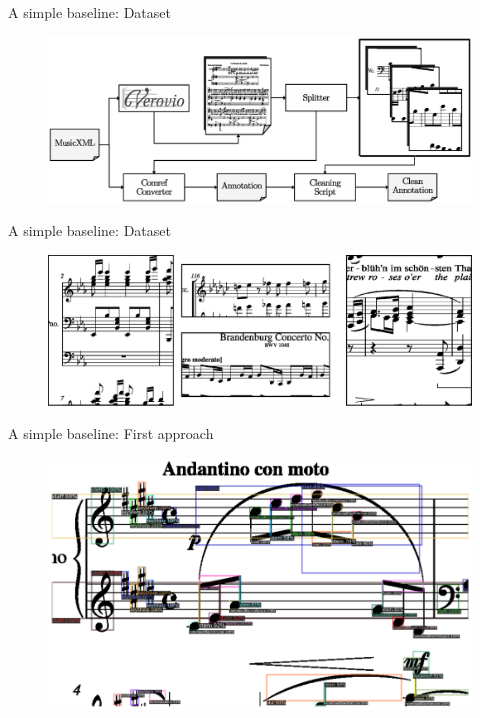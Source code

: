 \documentclass[UKenglish, aspectratio = 169]{beamer}
\begin{document}


\begin{frame}[c]{A simple baseline: Dataset}
	\begin{figure}
		\includegraphics[width=.9\textwidth]{diagrams/dataset_generation.eps}
	\end{figure}
\end{frame}


\begin{frame}[c]{A simple baseline: Dataset}
	\begin{figure}
		\includegraphics[width=.9\textwidth]{images/dataset_examples.eps}
	\end{figure}
\end{frame}



\hidelogo
\begin{frame}[c]{A simple baseline: First approach}
	\begin{figure}
		\includegraphics[width=.8\textwidth]{images/predictions.eps}
	\end{figure}
\end{frame}
\showlogo
\end{document}
